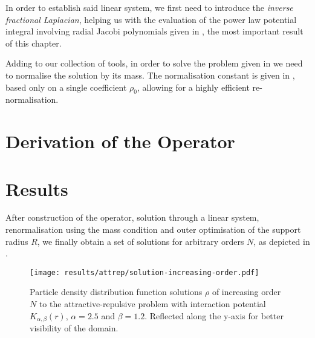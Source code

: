 In order to establish said linear system, we first need to introduce the \textit{inverse fractional Laplacian}, helping us with the evaluation of the power law potential integral involving radial Jacobi polynomials given in , the most important result of this chapter.





Adding to our collection of tools, in order to solve the problem given in  we need to normalise the solution by its mass.
The normalisation constant is given in , based only on a single coefficient $\rho_0$, allowing for a highly efficient re-normalisation.


\section{Derivation of the Operator}
\label{sec:derivation-of-operator}






\section{Results}
After construction of the operator, solution through a linear system, renormalisation using the mass condition and outer optimisation of the support radius $R$, we finally obtain a set of solutions for arbitrary orders $N$, as depicted in .

\begin{figure}[H]
  \centering
  \texttt{[image: results/attrep/solution-increasing-order.pdf]}
  \caption[Solutions of increasing orders]{Particle density distribution function solutions $\rho$ of increasing order $N$ to the attractive-repulsive problem with interaction potential $K_{\alpha, \beta}(r)$, $\alpha = 2.5$ and $\beta = 1.2$. Reflected along the y-axis for better visibility of the domain.}
  \label{fig:solution-increasing-order}
\end{figure}

